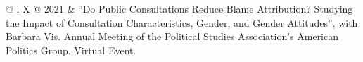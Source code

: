 \documentclass[letterpaper,fontsize=10.5pt]{scrartcl}
\begin{document}
\begin{longtblr}[entry=none,label=none]{@{} l X @{} }
	2021 & ``Do Public Consultations Reduce Blame Attribution? Studying the Impact of Consultation Characteristics, Gender, and Gender Attitudes'', with Barbara Vis. Annual Meeting of the Political Studies Association's American Politics Group, Virtual Event.\\




\end{longtblr}
\end{document}
